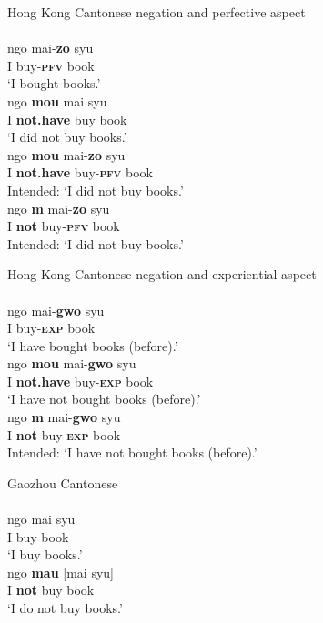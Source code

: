 \documentclass[output=paper]{langscibook}
\begin{document}
\ea Hong Kong Cantonese negation and perfective aspect \label{ex:lam5}\\
   \label{ex:lam5a}\\
    \gll ngo mai-\textbf{zo} syu\\
	I buy-\textbf{\textsc{pfv}} book\\
	\glt `I bought books.'
   \label{ex:lam5b}\\
    \gll ngo \textbf{mou} mai syu\\
	I \textbf{not.have} buy book\\
	\glt `I did not buy books.'
   \label{ex:lam5c}\\
  	\gll *ngo \textbf{mou} mai-\textbf{zo} syu\\
	I \textbf{not.have} buy-\textbf{\textsc{pfv}} book\\
	\glt Intended: `I did not buy books.'
   \label{ex:lam5d}\\
  	\gll *ngo \textbf{m} mai-\textbf{zo} syu\\
  	I \textbf{not} buy-\textbf{\textsc{pfv}} book\\
  	\glt Intended: `I did not buy books.'
\z \z


\ea Hong Kong Cantonese negation and experiential aspect \label{ex:lam6}\\
   \label{ex:lam6a}\\
  	\gll ngo mai-\textbf{gwo} syu\\
	I buy-\textbf{\textsc{exp}} book\\
	\glt `I have bought books (before).'
   \label{ex:lam6b}\\
  	\gll ngo \textbf{mou} mai-\textbf{gwo} syu \\
  	I \textbf{not.have} buy-\textbf{\textsc{exp}} book\\
  	\glt `I have not bought books (before).'
   \label{ex:lam6c}\\
	\gll *ngo \textbf{m} mai-\textbf{gwo} syu\\
  	I \textbf{not} buy-\textbf{\textsc{exp}} book\\
	\glt Intended: `I have not bought books (before).'
\z\z


\ea Gaozhou Cantonese \label{ex:lam7}\\
   \label{ex:lam7a}\\
  	\gll ngo	mai	syu\\
  	I buy book\\
	\glt `I buy books.'
   \label{ex:lam7b}\\
  	\gll ngo \textbf{mau} [mai syu]\\
  	I \textbf{not} buy book\\
  	\glt `I do not buy books.'
\z\z
\end{document}

